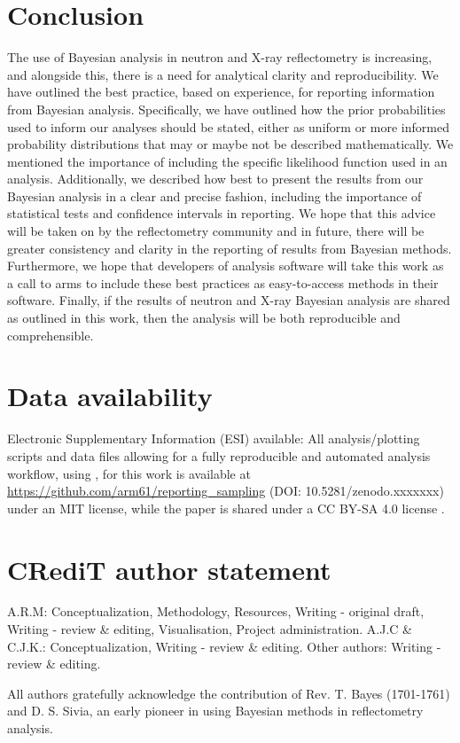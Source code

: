 \documentclass[reprint,superscriptaddress,aps,amsmath,linenumbers]{revtex4-2}
\begin{document}
\section{Conclusion}
\label{sec:conclusions}

The use of Bayesian analysis in neutron and X-ray reflectometry is increasing, and alongside this, there is a need for analytical clarity and reproducibility. 
We have outlined the best practice, based on experience, for reporting information from Bayesian analysis. 
Specifically, we have outlined how the prior probabilities used to inform our analyses should be stated, either as uniform or more informed probability distributions that may or maybe not be described mathematically. 
We mentioned the importance of including the specific likelihood function used in an analysis. 
Additionally, we described how best to present the results from our Bayesian analysis in a clear and precise fashion, including the importance of statistical tests and confidence intervals in reporting.
We hope that this advice will be taken on by the reflectometry community and in future, there will be greater consistency and clarity in the reporting of results from Bayesian methods.
Furthermore, we hope that developers of analysis software will take this work as a call to arms to include these best practices as easy-to-access methods in their software.
Finally, if the results of neutron and X-ray Bayesian analysis are shared as outlined in this work, then the analysis will be both reproducible and comprehensible.

\section*{Data availability}

Electronic Supplementary Information (ESI) available: All analysis/plotting scripts and data files allowing for a fully reproducible and automated analysis workflow, using \showyourwork \cite{luger_showyourwork_2021}, for this work is available at \url{https://github.com/arm61/reporting_sampling} (DOI: 10.5281/zenodo.xxxxxxx) under an MIT license, while the paper is shared under a CC BY-SA 4.0 license \cite{mccluskey_github_2022}.

\section*{CR\lowercase{e}d\lowercase{i}T author statement}
\label{sec:credit}

A.R.M: Conceptualization, Methodology, Resources, Writing - original draft, Writing - review \& editing, Visualisation, Project administration.
A.J.C \& C.J.K.: Conceptualization, Writing - review \& editing.
Other authors: Writing - review \& editing.

\begin{acknowledgments}
    All authors gratefully acknowledge the contribution of Rev. T. Bayes (1701-1761) and D. S. Sivia, an early pioneer in using Bayesian methods in reflectometry analysis.
\end{acknowledgments}



\end{document}
